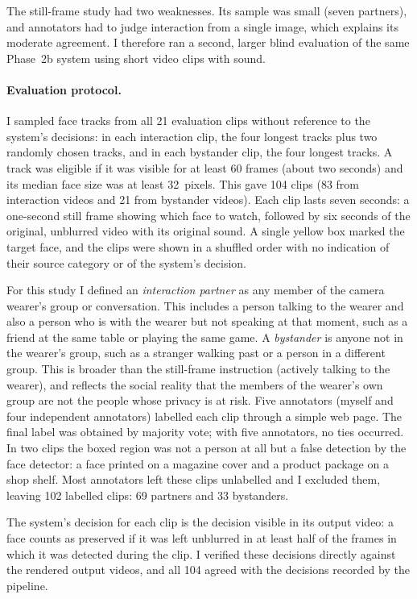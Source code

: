 The still-frame study had two weaknesses. Its sample was small (seven partners),
and annotators had to judge interaction from a single image, which explains its
moderate agreement. I therefore ran a second, larger blind evaluation of the same
Phase~2b system using short video clips with sound.

\paragraph{Evaluation protocol.}
I sampled face tracks from all 21 evaluation clips without reference to the
system's decisions: in each interaction clip, the four longest tracks plus two
randomly chosen tracks, and in each bystander clip, the four longest tracks. A track
was eligible if it was visible for at least 60 frames (about two seconds) and its
median face size was at least 32~pixels. This gave 104 clips (83 from interaction
videos and 21 from bystander videos). Each clip lasts seven seconds: a one-second
still frame showing which face to watch, followed by six seconds of the original,
unblurred video with its original sound. A single yellow box marked the target face,
and the clips were shown in a shuffled order with no indication of their source
category or of the system's decision.

For this study I defined an \emph{interaction partner} as any member of the camera
wearer's group or conversation. This includes a person talking to the wearer and
also a person who is with the wearer but not speaking at that moment, such as a
friend at the same table or playing the same game. A \emph{bystander} is anyone not
in the wearer's group, such as a stranger walking past or a person in a different
group. This is broader than the still-frame instruction (actively talking to the
wearer), and reflects the social reality that the members of the wearer's own group
are not the people whose privacy is at risk. Five annotators (myself and four
independent annotators) labelled each clip through a simple web page. The final
label was obtained by majority vote; with five annotators, no ties occurred. In two clips the boxed region was
not a person at all but a false detection by the face detector: a face printed on a
magazine cover and a product package on a shop shelf. Most annotators left these
clips unlabelled and I excluded them, leaving 102 labelled clips: 69 partners and 33
bystanders.

The system's decision for each clip is the decision visible in its output video: a
face counts as preserved if it was left unblurred in at least half of the frames in
which it was detected during the clip. I verified these decisions directly against
the rendered output videos, and all 104 agreed with the decisions recorded by the
pipeline.

